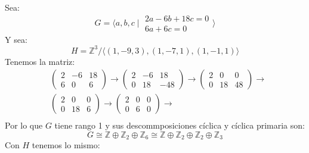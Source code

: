\begin{ejemplo} %
    Sea:    
    \begin{equation*}
        G = \langle a,b,c\mid \begin{array}{c}
            2a - 6b + 18c = 0 \\
            6a + 6c = 0
        \end{array}\rangle 
    \end{equation*}
    Y sea:
    \begin{equation*}
        H = \mathbb{Z}^3/\langle (1,-9,3), (1,-7,1), (1,-1,1) \rangle 
    \end{equation*}
    Tenemos la matriz:
    \begin{align*}
        &\left(\begin{array}{ccc}
            2 & -6 & 18 \\
            6 & 0 & 6 
        \end{array}\right)
        \stackrel{}{\longrightarrow}
        \left(\begin{array}{ccc}
            2 & -6 & 18 \\
            0 & 18 & -48 
        \end{array}\right)
        \stackrel{}{\longrightarrow}
        \left(\begin{array}{ccc}
            2 & 0 & 0 \\
            0 & 18 & 48 
        \end{array}\right)
        \stackrel{}{\longrightarrow} \\
        &\left(\begin{array}{ccc}
            2 & 0 & 0 \\
            0 & 18 & 6 
        \end{array}\right)
        \stackrel{}{\longrightarrow} 
        \left(\begin{array}{ccc}
            2 & 0 & 0 \\
            0 & 6 & 0 
        \end{array}\right)
        \stackrel{}{\longrightarrow} \\
    \end{align*}
    Por lo que $G$ tiene rango 1 y sus descommposiciones cíclica y cíclica primaria son:
    \begin{equation*}
        G\cong \mathbb{Z}\oplus\mathbb{Z}_2\oplus\mathbb{Z}_6 \cong \mathbb{Z}\oplus\mathbb{Z}_2\oplus\mathbb{Z}_2\oplus\mathbb{Z}_3
    \end{equation*}
    Con $H$ tenemos lo mismo:

\end{ejemplo}
